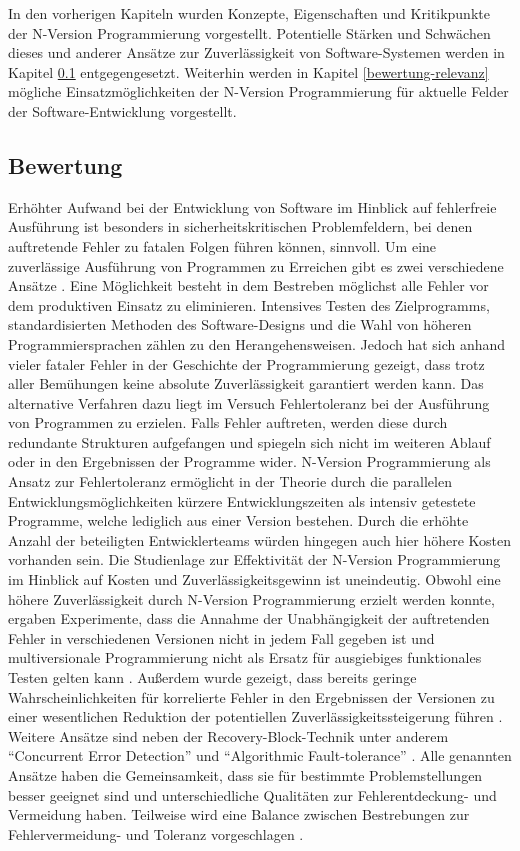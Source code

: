 %
In den vorherigen Kapiteln wurden Konzepte, Eigenschaften und Kritikpunkte der N-Version Programmierung vorgestellt.
Potentielle Stärken und Schwächen dieses und anderer Ansätze zur Zuverlässigkeit von Software-Systemen werden in Kapitel \ref{vergleich} entgegengesetzt. 
Weiterhin werden in Kapitel \ref{bewertung-relevanz} mögliche Einsatzmöglichkeiten der N-Version Programmierung für aktuelle Felder der Software-Entwicklung vorgestellt.
%
\subsection{Bewertung}\label{vergleich}
Erhöhter Aufwand bei der Entwicklung von Software im Hinblick auf fehlerfreie Ausführung ist besonders in sicherheitskritischen Problemfeldern, bei denen auftretende Fehler zu fatalen Folgen führen können, sinnvoll.
Um eine zuverlässige Ausführung von Programmen zu Erreichen gibt es zwei verschiedene Ansätze \cite{Avizienis:1975:FFC:800027.808469}. Eine Möglichkeit besteht in dem Bestreben möglichst alle Fehler vor dem produktiven Einsatz zu eliminieren. Intensives Testen des Zielprogramms, standardisierten Methoden des Software-Designs und die Wahl von höheren Programmiersprachen zählen zu den Herangehensweisen. Jedoch hat sich anhand vieler fataler Fehler in der Geschichte der Programmierung gezeigt, dass trotz aller Bemühungen keine absolute Zuverlässigkeit garantiert werden kann. Das alternative Verfahren dazu liegt im Versuch Fehlertoleranz bei der Ausführung von Programmen zu erzielen. Falls Fehler auftreten, werden diese durch redundante Strukturen aufgefangen und spiegeln sich nicht im weiteren Ablauf oder in den Ergebnissen der Programme wider. N-Version Programmierung als Ansatz zur Fehlertoleranz ermöglicht in der Theorie durch die parallelen Entwicklungsmöglichkeiten kürzere Entwicklungszeiten als intensiv getestete Programme, welche lediglich aus einer Version bestehen. Durch die erhöhte Anzahl der beteiligten Entwicklerteams würden hingegen auch hier höhere Kosten vorhanden sein. Die Studienlage zur Effektivität der N-Version Programmierung im Hinblick auf Kosten und Zuverlässigkeitsgewinn ist uneindeutig. Obwohl eine höhere Zuverlässigkeit durch N-Version Programmierung erzielt werden konnte, ergaben Experimente, dass die Annahme der Unabhängigkeit der auftretenden Fehler in verschiedenen Versionen nicht in jedem Fall gegeben ist \cite{Knight:1986:EEA:10677.10688} und multiversionale Programmierung nicht als Ersatz für ausgiebiges funktionales Testen gelten kann \cite{Shimeall:1991:ECS:104878.104899}. Außerdem wurde gezeigt, dass bereits geringe Wahrscheinlichkeiten für korrelierte Fehler in den Ergebnissen der Versionen zu einer wesentlichen Reduktion der potentiellen Zuverlässigkeitssteigerung führen \cite{Eckhardt:1985:TBA:1314034.1314066}.
Weitere Ansätze sind neben der Recovery-Block-Technik unter anderem \enquote{Concurrent Error Detection} und \enquote{Algorithmic Fault-tolerance} \cite{229487}. Alle genannten Ansätze haben die Gemeinsamkeit, dass sie für bestimmte Problemstellungen besser geeignet sind und unterschiedliche Qualitäten zur Fehlerentdeckung- und Vermeidung haben. Teilweise wird eine Balance zwischen Bestrebungen zur Fehlervermeidung- und Toleranz vorgeschlagen \cite{Avizienis:1975:FFC:800027.808469}.
%
